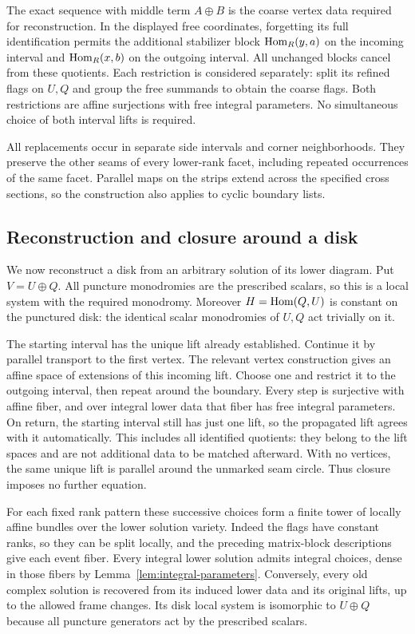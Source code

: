 The exact sequence with middle term $A\oplus B$ is the coarse vertex
data required for reconstruction.  In the displayed free coordinates,
forgetting its full identification permits the additional stabilizer
block $\operatorname{Hom}_R(y,a)$ on the incoming interval and $\operatorname{Hom}_R(x,b)$ on
the outgoing interval.  All unchanged blocks cancel from these
quotients.  Each restriction is considered separately: split its
refined flags on $U,Q$ and group the free summands to obtain the
coarse flags.  Both restrictions are affine surjections with free
integral parameters.  No simultaneous choice of both interval lifts
is required.

All replacements occur in separate side intervals and corner
neighborhoods.  They preserve the other seams of every lower-rank
facet, including repeated occurrences of the same facet.  Parallel
maps on the strips extend across the specified cross sections, so
the construction also applies to cyclic boundary lists.

\subsection{Reconstruction and closure around a disk}

We now reconstruct a disk from an arbitrary solution of its lower
diagram.  Put $V=U\oplus Q$.  All puncture monodromies are the
prescribed scalars, so this is a local system with the required
monodromy.  Moreover $H=\operatorname{Hom}(Q,U)$ is constant on the punctured
disk: the identical scalar monodromies of $U,Q$ act trivially on it.

The starting interval has the unique lift already established.
Continue it by parallel transport to the first vertex.  The relevant
vertex construction gives an affine space of extensions of this
incoming lift.  Choose one and restrict it to the outgoing interval,
then repeat around the boundary.  Every step is surjective with affine
fiber, and over integral lower data that fiber has free integral
parameters.  On return, the starting interval still has just one lift,
so the propagated lift agrees with it automatically.  This includes
all identified quotients: they belong to the lift spaces and are not
additional data to be matched afterward.  With no vertices, the same
unique lift is parallel around the unmarked seam circle.  Thus closure
imposes no further equation.

For each fixed rank pattern these successive choices form a finite
tower of locally affine bundles over the lower solution variety.
Indeed the flags have constant ranks, so they can be split locally,
and the preceding matrix-block descriptions give each event fiber.
Every integral lower solution admits integral choices, dense in those
fibers by Lemma~\ref{lem:integral-parameters}.  Conversely, every old
complex solution is recovered from its induced lower data and its
original lifts, up to the allowed frame changes.  Its disk local
system is isomorphic to $U\oplus Q$ because all puncture generators
act by the prescribed scalars.

